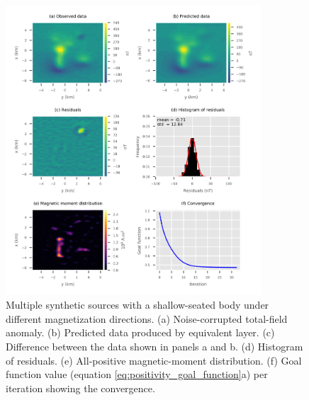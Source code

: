 \begin{figure}
	\centering
	\includegraphics[width=0.85\textwidth]{Fig/unidir_shallow_diff_test/Fig4.png}
	\caption{Multiple synthetic sources with a shallow-seated body under different magnetization directions. (a) Noise-corrupted total-field anomaly. (b) Predicted data produced by equivalent layer. (c) Difference between the data shown in panels a and b. (d) Histogram of residuals. (e) All-positive magnetic-moment distribution. (f) Goal function value (equation \ref{eq:positivity_goal_function}a) per iteration showing the convergence.}
	\label{fig:unidir_shallow_diff_test}
\end{figure}

